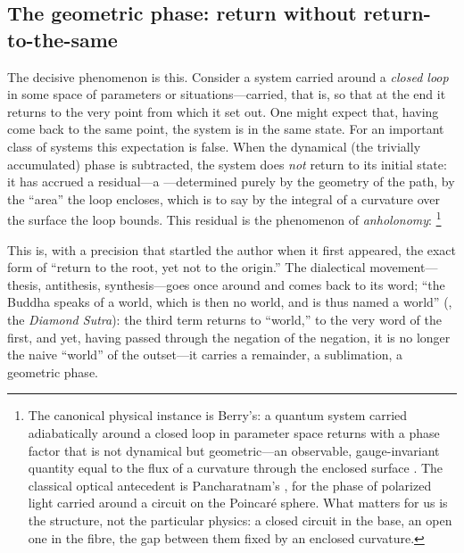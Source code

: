\subsection{The geometric phase: return without return-to-the-same}
\label{p09:sec:geom-phase}

The decisive phenomenon is this. Consider a system carried around a \emph{closed loop} in some space of parameters or situations---carried, that is, so that at the end it returns to the very point from which it set out. One might expect that, having come back to the same point, the system is in the same state. For an important class of systems this expectation is false. When the dynamical (the trivially accumulated) phase is subtracted, the system does \emph{not} return to its initial state: it has accrued a residual---a ---determined purely by the geometry of the path, by the ``area'' the loop encloses, which is to say by the integral of a curvature over the surface the loop bounds. This residual is the phenomenon of \emph{anholonomy}: \footnote{The canonical physical instance is Berry's: a quantum system carried adiabatically around a closed loop in parameter space returns with a phase factor that is not dynamical but geometric---an observable, gauge-invariant quantity equal to the flux of a curvature through the enclosed surface \parencite{berry1984}. The classical optical antecedent is Pancharatnam's \parencite{pancharatnam1956}, for the phase of polarized light carried around a circuit on the Poincaré sphere. What matters for us is the structure, not the particular physics: a closed circuit in the base, an open one in the fibre, the gap between them fixed by an enclosed curvature.}

This is, with a precision that startled the author when it first appeared, the exact form of ``return to the root, yet not to the origin.'' The dialectical movement---thesis, antithesis, synthesis---goes once around and comes back to its word; ``the Buddha speaks of a world, which is then no world, and is thus named a world'' (, the \emph{Diamond Sutra}): the third term returns to ``world,'' to the very word of the first, and yet, having passed through the negation of the negation, it is no longer the naive ``world'' of the outset---it carries a remainder, a sublimation, a geometric phase. 


